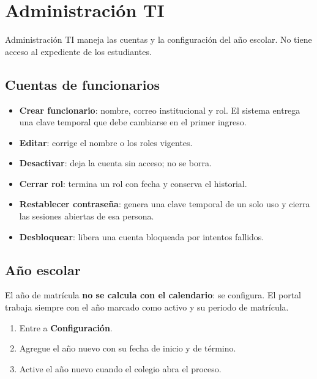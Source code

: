 \section{Administración TI}

Administración TI maneja las cuentas y la configuración del año escolar. No
tiene acceso al expediente de los estudiantes.

\subsection{Cuentas de funcionarios}


\begin{itemize}[leftmargin=*,itemsep=0.2em]
\item \textbf{Crear funcionario}: nombre, correo institucional y rol. El
  sistema entrega una clave temporal que debe cambiarse en el primer ingreso.
\item \textbf{Editar}: corrige el nombre o los roles vigentes.
\item \textbf{Desactivar}: deja la cuenta sin acceso; no se borra.
\item \textbf{Cerrar rol}: termina un rol con fecha y conserva el historial.
\item \textbf{Restablecer contraseña}: genera una clave temporal de un solo
  uso y cierra las sesiones abiertas de esa persona.
\item \textbf{Desbloquear}: libera una cuenta bloqueada por intentos fallidos.
\end{itemize}

\subsection{Año escolar}


El año de matrícula \textbf{no se calcula con el calendario}: se configura. El
portal trabaja siempre con el año marcado como activo y su periodo de
matrícula.

\begin{enumerate}[leftmargin=*,itemsep=0.2em]
\item Entre a \textbf{Configuración}.
\item Agregue el año nuevo con su fecha de inicio y de término.
\item Active el año nuevo cuando el colegio abra el proceso.
\end{enumerate}
